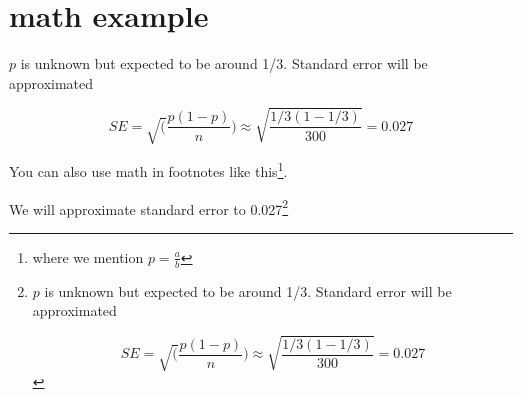 \documentclass[
]{book}
\begin{document}
\hypertarget{math-example}{%
\section{math example}\label{math-example}}

\(p\) is unknown but expected to be around 1/3. Standard error will be approximated

\[
SE = \sqrt(\frac{p(1-p)}{n}) \approx \sqrt{\frac{1/3 (1 - 1/3)} {300}} = 0.027
\]

You can also use math in footnotes like this\footnote{where we mention \(p = \frac{a}{b}\)}.

We will approximate standard error to 0.027\footnote{\(p\) is unknown but expected to be around 1/3. Standard error will be approximated

  \[
  SE = \sqrt(\frac{p(1-p)}{n}) \approx \sqrt{\frac{1/3 (1 - 1/3)} {300}} = 0.027
  \]}

  
\end{document}
